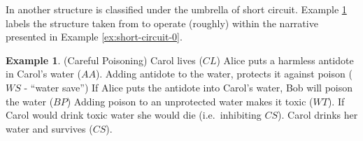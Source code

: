 \documentclass[11pt,a4paper]{book}
\theoremstyle{definition}
\theoremstyle{definition}
\newtheorem{example}{Example}[section]
\theoremstyle{definition}
\theoremstyle{remark}
\newcommand{\hpu}{\texttt{HP-05}\,}
\newcommand{\ptc}{\texttt{PTC}\,}
\newcommand{\hpm}{\texttt{HP-15}\,}
\newcommand{\hpuc}{\texttt{HP-05c}\,}
\newcommand{\bvcm}{\texttt{BV-CM}\,}
\newcommand{\bci}{\texttt{BCI}\,}
\newcommand{\scacc}{\texttt{SC-ACC}\,}
\newcommand{\pcps}{\texttt{PCPS}\,}
\newcommand{\at}{\texttt{AT}\,}
\newcommand{\sccf}{\texttt{SC-CF}\,}
\begin{document}

In \parencite{baumgartner2013regularity} another structure is classified under the umbrella of short circuit.
Example \ref{ex:short-circuit-1} labels the structure taken from \parencite{baumgartner2013regularity} to operate (roughly) within the narrative presented in Example \ref{ex:short-circuit-0}.


\begin{example}(Careful Poisoning)
\label{ex:short-circuit-1}
Carol lives ($CL$)
Alice puts a harmless antidote in Carol's water ($AA$). 
Adding antidote to the water, protects it against poison ($WS$ - ``water save'')
If Alice puts the antidote into Carol's water, Bob will poison the water ($BP$)
Adding poison to an unprotected water makes it toxic ($WT$).
If Carol would drink toxic water she would die (i.e.\ inhibiting $CS$).
Carol drinks her water and survives ($CS$).
%
\begin{center}
\end{center}
\end{example}
\end{document}
